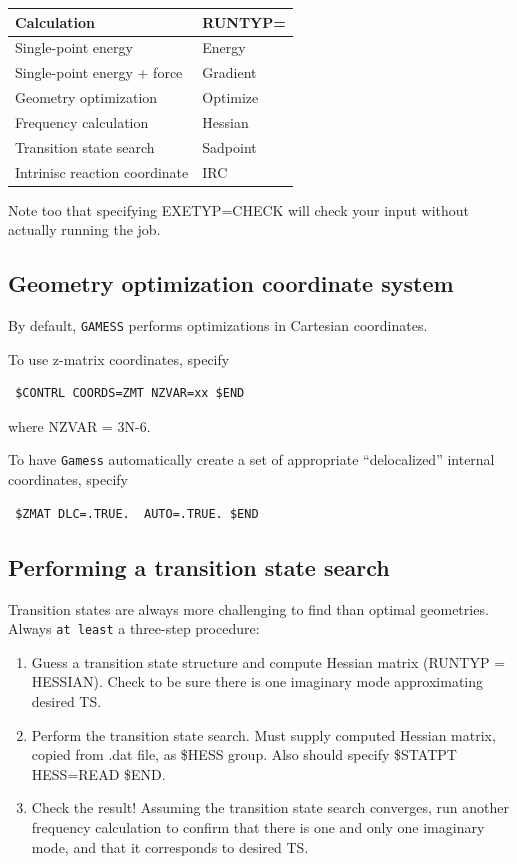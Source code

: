 \documentclass[11pt]{article}
\begin{document}
\begin{center}
\begin{tabular}{ll}
Calculation & RUNTYP=\\
\hline
Single-point energy & Energy\\
Single-point energy + force & Gradient\\
Geometry optimization & Optimize\\
Frequency calculation & Hessian\\
Transition state search & Sadpoint\\
Intrinisc reaction coordinate & IRC\\
\end{tabular}
\end{center}

Note too that specifying EXETYP=CHECK will check your input without actually running the job.
\subsection{Geometry optimization coordinate system}
\label{sec:orgf3730d3}
By default, \texttt{GAMESS} performs optimizations in Cartesian coordinates.

To use z-matrix coordinates, specify
\begin{verbatim}
 $CONTRL COORDS=ZMT NZVAR=xx $END
\end{verbatim}
where NZVAR = 3N-6.

To have \texttt{Gamess} automatically create a set of appropriate ``delocalized'' internal coordinates, specify
\begin{verbatim}
 $ZMAT DLC=.TRUE.  AUTO=.TRUE. $END
\end{verbatim}
\subsection{Performing a transition state search}
\label{sec:orgab74cb3}
Transition states are always more challenging to find than optimal geometries.  Always \texttt{at least} a three-step procedure:

\begin{enumerate}
\item Guess a transition state structure and compute Hessian matrix (RUNTYP = HESSIAN).  Check to be sure there is one imaginary mode approximating desired TS.
\item Perform the transition state search.  Must supply computed Hessian matrix, copied from .dat file, as \$HESS group.  Also should specify \$STATPT HESS=READ \$END.
\item Check the result!  Assuming the transition state search converges, run another frequency calculation to confirm that there is one and only one imaginary mode, and that it corresponds to desired TS.
\end{enumerate}
\end{document}
